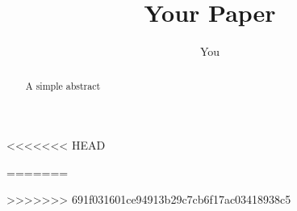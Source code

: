 \documentclass{article}
\title{Your Paper}
\author{You}
\begin{document}
\maketitle
\begin{abstract}
A simple abstract
\end{abstract}

<<<<<<< HEAD
	
=======

>>>>>>> 691f031601ce94913b29c7cb6f17ac03418938c5



\end{document}
